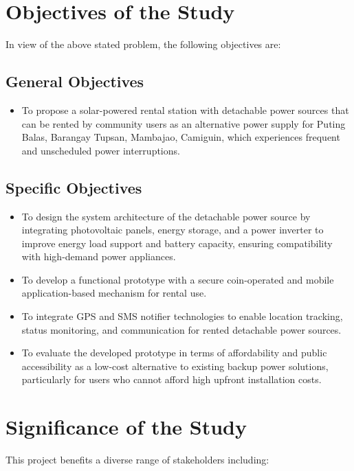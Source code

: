 {\section{Objectives of the Study}

In view of the above stated problem, the following objectives are:

\subsection{General Objectives}
\begin{itemize}
	\item To propose a solar-powered rental station with detachable power sources that can be rented by community users as an alternative power supply for Puting Balas, Barangay Tupsan, Mambajao, Camiguin, which experiences frequent and unscheduled power interruptions.
\end{itemize}

\subsection{Specific Objectives}
\begin{itemize}
	\item To design the system architecture of the detachable power source by integrating photovoltaic panels, energy storage, and a power inverter to improve energy load support and battery capacity, ensuring compatibility with high-demand power appliances.
	\item To develop a functional prototype with a secure coin-operated and mobile application-based mechanism for rental use.
	\item To integrate GPS and SMS notifier technologies to enable location tracking, status monitoring, and communication for rented detachable power sources.
	\item To evaluate the developed prototype in terms of affordability and public accessibility as a low-cost alternative to existing backup power solutions, particularly for users who cannot afford high upfront installation costs.
\end{itemize}


\section{Significance of the Study}

This project benefits a diverse range of stakeholders including: 

}
